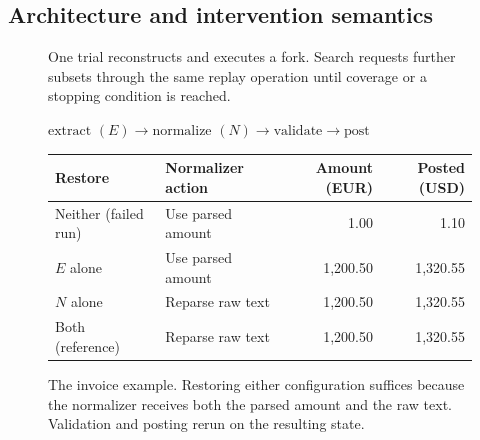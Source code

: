 \documentclass[11pt,letterpaper]{article}
\begin{document}
\subsection{Architecture and intervention semantics}
\begin{figure}[htbp]\centering
{}
\caption{One trial reconstructs and executes a fork. Search requests further subsets through the same replay operation until coverage or a stopping condition is reached.}
\end{figure}

\begin{figure}[htbp]\centering
$\boxed{\text{extract }(E)}\longrightarrow\boxed{\text{normalize }(N)}
\longrightarrow\boxed{\text{validate}}\longrightarrow\boxed{\text{post}}$\\[4pt]
\small
\begin{tabular}{@{}llrr@{}}\toprule
Restore & Normalizer action & Amount (EUR) & Posted (USD)\\\midrule
Neither (failed run) & Use parsed amount & 1.00 & 1.10\\
$E$ alone & Use parsed amount & 1,200.50 & 1,320.55\\
$N$ alone & Reparse raw text & 1,200.50 & 1,320.55\\
Both (reference) & Reparse raw text & 1,200.50 & 1,320.55\\\bottomrule
\end{tabular}
\caption{The invoice example. Restoring either configuration suffices because the normalizer receives both the parsed amount and the raw text. Validation and posting rerun on the resulting state.}\label{fig:invoice}
\end{figure}
\end{document}
